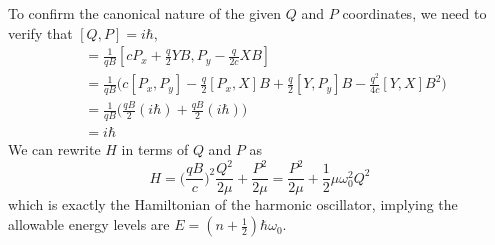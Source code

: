 \documentclass[../principles-of-quantum-mechanics.tex]{subfiles}
\begin{document}
\begin{questions}
\begin{solution}
		To confirm the canonical nature of the given $Q$ and $P$ coordinates, we need to verify that $[Q, P] = i\hbar$,
		\begin{align*}
			[Q, P] &= \frac{1}{qB}[cP_x + \frac{q}{2}YB, P_y - \frac{q}{2c}XB] \\
			&= \frac{1}{qB}\Big(c[P_x, P_y] - \frac{q}{2}[P_x, X]B + \frac{q}{2}[Y, P_y]B - \frac{q^2}{4c}[Y, X]B^2\Big) \\
			&= \frac{1}{qB}\Big(\frac{qB}{2}(i\hbar) + \frac{qB}{2}(i\hbar)\Big) \\
			&= i\hbar
		\end{align*}
		We can rewrite $H$ in terms of $Q$ and $P$ as
		$$H = \Big(\frac{qB}{c}\Big)^2\frac{Q^2}{2\mu} + \frac{P^2}{2\mu} = \frac{P^2}{2\mu} + \frac{1}{2}\mu\omega_0^2Q^2$$
		which is exactly the Hamiltonian of the harmonic oscillator, implying the allowable energy levels are $E = (n + \frac{1}{2})\hbar\omega_0$.


\end{solution}
\end{questions}
\end{document}
